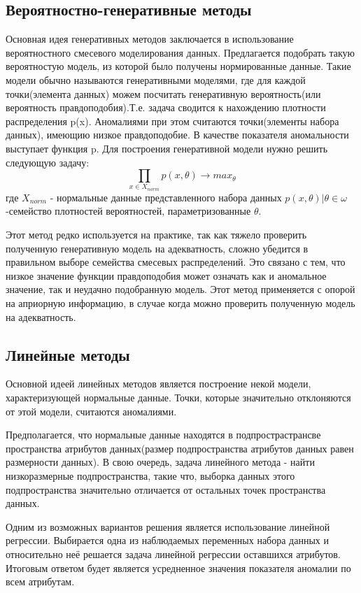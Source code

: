 \subsection{Вероятностно-генеративные методы}
Основная идея генеративных методов заключается в использование вероятностного смесевого моделирования данных. Предлагается подобрать такую вероятностую модель, из которой было получены нормированные данные. Такие модели обычно называются генеративными моделями, где для каждой точки(элемента данных) можем посчитать генеративную вероятность(или вероятность правдоподобия).Т.е. задача  сводится к нахождению плотности распределения p(x). Аномалиями при этом  считаются точки(элементы набора данных), имеющию низкое правдоподобие. В качестве показателя аномальности выступает функция p.
Для построения генеративной модели нужно решить следующую задачу:
	\begingroup
	\Large
	\begin{equation}
	\prod \limits_{x \in X_{norm}} p(x,\theta)  \rightarrow max_\theta
		\end{equation}
	\endgroup
		где \begingroup \Large$ X_{norm}$ \endgroup - нормальные данные представленного набора данных ${p(x,\theta)|\theta \in \omega}$ -семейство плотностей вероятностей, параметризованные $\theta$.
		
Этот метод редко используется на практике, так как тяжело проверить полученную генеративную модель на адекватность, сложно  убедится в правильном выборе семейства смесевых распределений. Это связано с тем, что низкое значение функции правдоподобия может означать как и аномальное значение, так и неудачно подобранную модель. Этот метод применяется с опорой на априорную информацию, в случае когда можно проверить полученную модель на адекватность.
\subsection{Линейные методы}
Основной идеей линейных методов является построение некой  модели, характеризующей нормальные данные. Точки, которые значительно отклоняются от этой модели, считаются аномалиями.

Предполагается, что нормальные данные  находятся в подпрострастрансве пространства атрибутов данных(размер подпространства атрибутов данных равен размерности данных). В свою очередь, задача линейного метода - найти низкоразмерные подпространства, такие что, выборка данных этого подпространства значительно отличается от остальных точек пространства данных.

Одним из возможных вариантов решения является использование линейной регрессии. Выбирается одна из наблюдаемых переменных  набора данных и относительно неё решается задача линейной регрессии оставшихся атрибутов. Итоговым ответом будет является усредненное значения показателя аномалии по всем атрибутам. 

